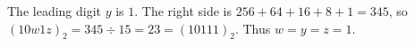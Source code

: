 The leading digit $ y $ is $ 1 $. The right side is $ 256+64+16+8+1=345 $, so $(10w1z)_2=345\div15=23=(10111)_2 $. Thus $\boxed{w=y=z=1}$.
